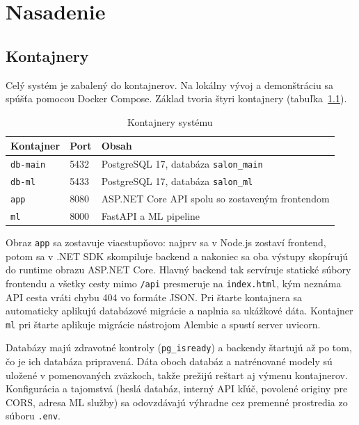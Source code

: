 
\chapter{Nasadenie}\label{ch:deployment}

\section{Kontajnery}

Celý systém je zabalený do kontajnerov. Na lokálny vývoj a demonštráciu sa spúšťa pomocou Docker Compose. Základ tvoria štyri kontajnery (tabuľka~\ref{tab:containers}).

\begin{table}[ht]
  \centering
  \caption{Kontajnery systému}\label{tab:containers}
  \begin{tabular}{@{}llp{}@{}}
    \toprule
    Kontajner & Port & Obsah \\
    \midrule
    \texttt{db-main} & 5432 & PostgreSQL 17, databáza \texttt{salon\_main} \\
    \texttt{db-ml}   & 5433 & PostgreSQL 17, databáza \texttt{salon\_ml} \\
    \texttt{app}     & 8080 & ASP.NET Core API spolu so zostaveným frontendom \\
    \texttt{ml}      & 8000 & FastAPI a ML pipeline \\
    \bottomrule
  \end{tabular}
\end{table}

Obraz \texttt{app} sa zostavuje viacstupňovo: najprv sa v Node.js zostaví frontend, potom sa v .NET SDK skompiluje backend a nakoniec sa oba výstupy skopírujú do runtime obrazu ASP.NET Core. Hlavný backend tak servíruje statické súbory frontendu a všetky cesty mimo \texttt{/api} presmeruje na \texttt{index.html}, kým neznáma API cesta vráti chybu 404 vo formáte JSON. Pri štarte kontajnera sa automaticky aplikujú databázové migrácie a naplnia sa ukážkové dáta. Kontajner \texttt{ml} pri štarte aplikuje migrácie nástrojom Alembic a spustí server uvicorn.

Databázy majú zdravotné kontroly (\texttt{pg\_isready}) a backendy štartujú až po tom, čo je ich databáza pripravená. Dáta oboch databáz a natrénované modely sú uložené v pomenovaných zväzkoch, takže prežijú reštart aj výmenu kontajnerov. Konfigurácia a tajomstvá (heslá databáz, interný API kľúč, povolené originy pre CORS, adresa ML služby) sa odovzdávajú výhradne cez premenné prostredia zo súboru \texttt{.env}.

